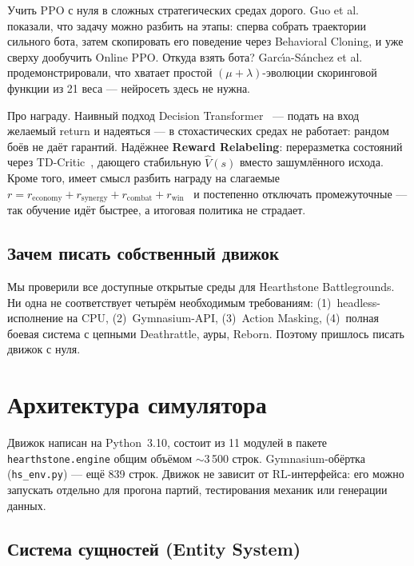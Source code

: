 \documentclass[a4paper,12pt]{extarticle}
\begin{document}
Учить PPO с нуля в сложных стратегических средах дорого. Guo et al.~\cite{pokemon} показали, что задачу можно разбить на этапы: сперва собрать траектории сильного бота, затем скопировать его поведение через Behavioral Cloning, и уже сверху дообучить Online PPO. Откуда взять бота? Garc\'{\i}a-S\'{a}nchez et al.~\cite{coevolution} продемонстрировали, что хватает простой $(\mu+\lambda)$-эволюции скоринговой функции из 21 веса --- нейросеть здесь не нужна.

Про награду. Наивный подход Decision Transformer~\cite{odt} --- подать на вход желаемый return и надеяться --- в стохастических средах не работает: рандом боёв не даёт гарантий. Надёжнее \textbf{Reward Relabeling}: переразметка состояний через TD-Critic~\cite{value_equiv}, дающего стабильную $\hat{V}(s)$ вместо зашумлённого исхода. Кроме того, имеет смысл разбить награду на слагаемые $r = r_{\text{economy}} + r_{\text{synergy}} + r_{\text{combat}} + r_{\text{win}}$~\cite{pokemon} и постепенно отключать промежуточные --- так обучение идёт быстрее, а итоговая политика не страдает.

\subsection{Зачем писать собственный движок}

Мы проверили все доступные открытые среды для Hearthstone Battlegrounds. Ни одна не соответствует четырём необходимым требованиям: (1)~headless-исполнение на CPU, (2)~Gymnasium-API, (3)~Action Masking, (4)~полная боевая система с цепными Deathrattle, ауры, Reborn. Поэтому пришлось писать движок с нуля.

\newpage

\section{Архитектура симулятора}

Движок написан на Python~3.10, состоит из 11 модулей в пакете \texttt{hearthstone.engine} общим объёмом $\sim$3\,500 строк. Gymnasium-обёртка (\texttt{hs\_env.py}) --- ещё 839 строк. Движок не зависит от RL-интерфейса: его можно запускать отдельно для прогона партий, тестирования механик или генерации данных.

\subsection{Система сущностей (Entity System)}
\end{document}
